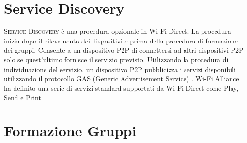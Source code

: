 \section{Service Discovery}

\textsc{Service Discovery} è una
procedura opzionale in Wi-Fi Direct. La procedura inizia dopo il
rilevamento dei dispositivi e prima della procedura di formazione dei
gruppi. Consente a un dispositivo P2P di connettersi ad altri dispositivi
P2P solo se quest'ultimo fornisce il servizio previsto. Utilizzando la
procedura di individuazione del servizio, un dispositivo P2P pubblicizza
i servizi disponibili utilizzando il protocollo GAS
(Generic Advertisement Service) \cite{wikipedia_2015}.
Wi-Fi Alliance ha definito una serie di servizi standard supportati
da Wi-Fi Direct come Play, Send e Print \cite{wi-fialliance}

\section{Formazione Gruppi}

